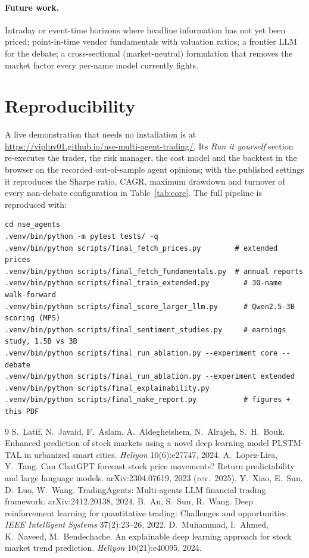 \documentclass[11pt,a4paper]{article}
\begin{document}
\paragraph{Future work.} Intraday or event-time horizons where headline information has not yet been priced; point-in-time vendor fundamentals with valuation ratios; a frontier LLM for the debate; a cross-sectional (market-neutral) formulation that removes the market factor every per-name model currently fights.
\section*{Reproducibility}
A live demonstration that needs no installation is at \url{https://vipluv01.github.io/nse-multi-agent-trading/}. Its \emph{Run it yourself} section re-executes the trader, the risk manager, the cost model and the backtest in the browser on the recorded out-of-sample agent opinions; with the published settings it reproduces the Sharpe ratio, CAGR, maximum drawdown and turnover of every non-debate configuration in Table~\ref{tab:core}. The full pipeline is reproduced with:
\begin{footnotesize}\begin{verbatim}
cd nse_agents
.venv/bin/python -m pytest tests/ -q
.venv/bin/python scripts/final_fetch_prices.py        # extended prices
.venv/bin/python scripts/final_fetch_fundamentals.py  # annual reports
.venv/bin/python scripts/final_train_extended.py        # 30-name walk-forward
.venv/bin/python scripts/final_score_larger_llm.py      # Qwen2.5-3B scoring (MPS)
.venv/bin/python scripts/final_sentiment_studies.py     # earnings study, 1.5B vs 3B
.venv/bin/python scripts/final_run_ablation.py --experiment core --debate
.venv/bin/python scripts/final_run_ablation.py --experiment extended
.venv/bin/python scripts/final_explainability.py
.venv/bin/python scripts/final_make_report.py           # figures + this PDF
\end{verbatim}\end{footnotesize}
\begin{thebibliography}{9}
 S.~Latif, N.~Javaid, F.~Aslam, A.~Aldegheishem, N.~Alrajeh, S.~H.~Bouk. Enhanced prediction of stock markets using a novel deep learning model PLSTM-TAL in urbanized smart cities. \emph{Heliyon} 10(6):e27747, 2024.
 A.~Lopez-Lira, Y.~Tang. Can ChatGPT forecast stock price movements? Return predictability and large language models. arXiv:2304.07619, 2023 (rev.\ 2025).
 Y.~Xiao, E.~Sun, D.~Luo, W.~Wang. TradingAgents: Multi-agents LLM financial trading framework. arXiv:2412.20138, 2024.
 B.~An, S.~Sun, R.~Wang. Deep reinforcement learning for quantitative trading: Challenges and opportunities. \emph{IEEE Intelligent Systems} 37(2):23--26, 2022.
 D.~Muhammad, I.~Ahmed, K.~Naveed, M.~Bendechache. An explainable deep learning approach for stock market trend prediction. \emph{Heliyon} 10(21):e40095, 2024.
\end{thebibliography}
\end{document}
